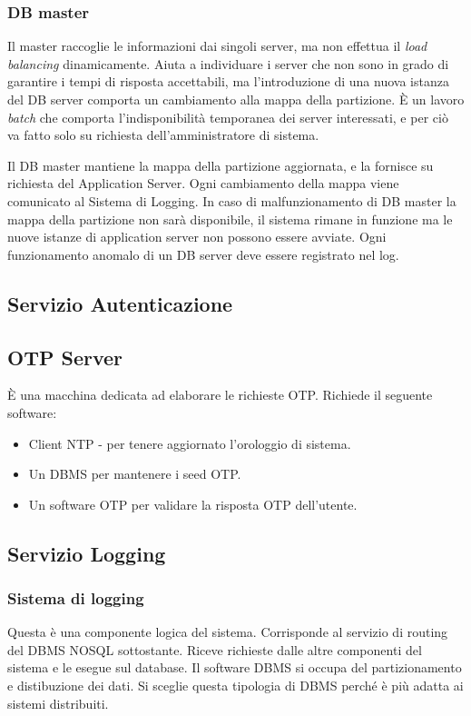 \subsubsection{DB master}
Il master raccoglie le informazioni dai singoli server, ma non effettua il \emph{load balancing} dinamicamente.
Aiuta a individuare i server che non sono in grado di garantire i tempi di risposta accettabili, ma l'introduzione di una nuova istanza del DB server comporta un cambiamento alla mappa della partizione. \`E un lavoro \emph{batch} che comporta l'indisponibilit\`a temporanea dei server interessati, e per ci\`o va fatto solo su richiesta dell'amministratore di sistema.

Il DB master mantiene la mappa della partizione aggiornata, e la fornisce su richiesta del Application Server.
Ogni cambiamento della mappa viene comunicato al Sistema di Logging.
In caso di malfunzionamento di DB master la mappa della partizione non sar\`a disponibile, il sistema rimane in funzione ma le nuove istanze di application server non possono essere avviate.
Ogni funzionamento anomalo di un DB server deve essere registrato nel log.
\subsection{Servizio Autenticazione}
\subsection{OTP Server}
\`E una macchina dedicata ad elaborare le richieste OTP. Richiede il seguente software:
\begin{itemize}
    \item Client NTP - per tenere aggiornato l'orologgio di sistema.
    \item Un DBMS per mantenere i seed OTP.
    \item Un software OTP per validare la risposta OTP dell'utente.
\end{itemize}

\subsection{Servizio Logging}
\subsubsection{Sistema di logging}
Questa \`e una componente logica del sistema.
Corrisponde al servizio di routing del DBMS NOSQL sottostante.
Riceve richieste dalle altre componenti del sistema e le esegue sul database.
Il software DBMS si occupa del partizionamento e distibuzione dei dati.
Si sceglie questa tipologia di DBMS perch\'e \`e pi\`u adatta ai sistemi distribuiti.

